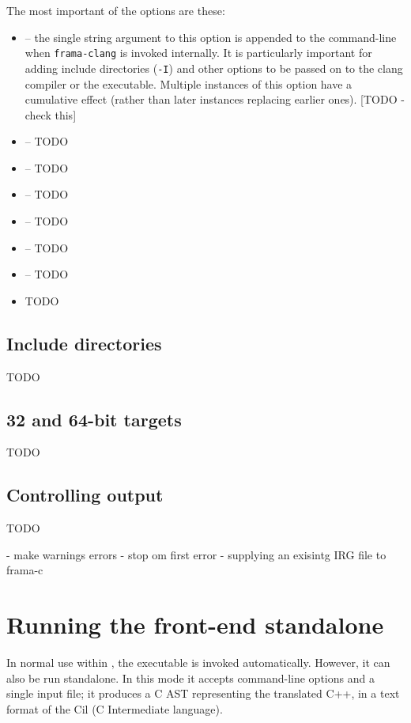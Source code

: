The most important of the options are these:
\begin{itemize}
	\item {} -- the single string argument to this option is appended to the command-line when 
	\lstinline|frama-clang| is invoked internally. It is particularly 
	important for adding include directories (\lstinline|-I|) and
	other options to be passed on to the clang compiler or the \irg executable. 
	Multiple instances of this option have a cumulative effect (rather
	than later instances replacing earlier ones). [TODO - check this]
	\item {} -- TODO
	\item {} -- TODO
	\item {} -- TODO
	\item {} -- TODO
	\item {} -- TODO
	\item {} -- TODO
		\item TODO
\end{itemize}

\section{Include directories}

TODO

\section{32 and 64-bit targets}

TODO


\section{Controlling output}

TODO

- make warnings errors
- stop om first error
- supplying an exisintg IRG file to frama-c

\chapter{Running the \fclang front-end standalone}
\label{sec:standalone}

In normal use within \framac, the \irg executable is
invoked automatically. However, it can also be run standalone.
In this mode it accepts command-line options and a single input file;
it produces a C AST representing the translated C++, in a text format 
of the Cil (C Intermediate language).

